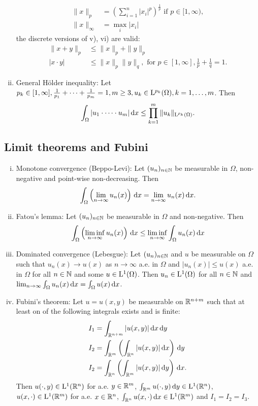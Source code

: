 \begin{enumerate}[i)]
    \begin{align*}
      \|x\|_p &= \left( \sum_{i = 1}^n |x_i|^p  \right)^{\frac{1}{p}} \text{ if } p \in [1,\infty), \\
        \|x\|_{\infty} &= \max_{i} |x_i|
    \end{align*}
    the discrete versions of v), vi) are valid:
    \begin{align*}
      \|x + y\|_p &\leq \|x\|_p + \|y\|_p \\
      |x \cdot y| &\leq \|x\|_p \|y\|_q, \text{ for } p \in [1, \infty], \frac{1}{p} + \frac{1}{q} =1.
    \end{align*}
  \item General Hölder inequality: Let $p_k \in [1,\infty], \frac{1}{p_1} + \cdots+ \frac{1}{p_m} = 1, m \geq 3, u_k \in \mathrm{L}^{p_k}(\Omega), k = 1,\dots,m$.
    Then
    $$
    \int_\Omega |u_1 \cdot \cdots \cdot u_m| \, {\operatorname{d}\!{x}} \leq \prod_{k = 1}^m \|u_k\|_{\mathrm{L}^{p_k}(\Omega)}.
    $$
\end{enumerate}

\subsection{Limit theorems and Fubini}

\begin{enumerate}[i)]
  \item Monotone convergence (Beppo-Levi): Let $(u_n)_{n \in \mathbb{N}}$ be measurable in $\Omega$, non-negative and point-wise non-decreasing. Then
    $$
    \int_\Omega \left( \lim_{n \to \infty} u_n(x) \right) \, {\operatorname{d}\!{x}} = \lim_{n \to \infty} u_n(x) \, {\operatorname{d}\!{x}}.
    $$
  \item Fatou's lemma: Let $(u_n)_{n \in \mathbb{N}}$ be measurable in $\Omega$ and non-negative. Then
    $$
    \int_\Omega \left( \liminf_{n \to \infty} u_n(x) \right) \, {\operatorname{d}\!{x}} 
    \leq \liminf_{n \to \infty} \int_\Omega u_n(x) \, {\operatorname{d}\!{x}}
    $$
  \item Dominated convergence (Lebesgue): Let $(u_n)_{n \in \mathbb{N}}$ and $u$ be measurable on $\Omega$ such that $u_n(x) \to u(x)$ as $n \to \infty$ a.e. in $\Omega$ and $|u_n(x)| \leq u(x)$ a.e. in $\Omega$ for all $n \in \mathbb{N}$ and some $u \in \mathrm{L}^1(\Omega)$.
    Then $u_n \in \mathrm{L}^1(\Omega)$ for all $n \in \mathbb{N}$ and $\lim_{n \to \infty} \int_\Omega u_n(x) \, {\operatorname{d}\!{x}} = \int_\Omega u(x) \, {\operatorname{d}\!{x}}$.
  \item Fubini's theorem: Let $u = u(x,y)$ be measurable on $\mathbb{R}^{n + m}$ such that at least on of the following integrals exists and is finite:
    \begin{align*}
      I_1 &= \int_{\mathbb{R}^{n + m}} |u(x,y)| \, {\operatorname{d}\!{x}} \, {\operatorname{d}\!{y}} \\
      I_2 &= \int_{\mathbb{R}^m} \left( \int_{\mathbb{R}^n} |u(x,y)| \, {\operatorname{d}\!{x}} \right) \, {\operatorname{d}\!{y}} \\
      I_2 &= \int_{\mathbb{R}^n} \left( \int_{\mathbb{R}^m} |u(x,y)| \, {\operatorname{d}\!{y}} \right) \, {\operatorname{d}\!{x}}.
    \end{align*}
    Then $u(\cdot,y) \in \mathrm{L}^1(\mathbb{R}^n)$ for a.e. $y \in \mathbb{R}^m$, $\int_{\mathbb{R}^m} u(\cdot,y) \, {\operatorname{d}\!{y}} \in \mathrm{L}^1(\mathbb{R}^n)$, $u(x,\cdot) \in \mathrm{L}^1(\mathbb{R}^m)$ for a.e. $x \in \mathbb{R}^n$, $\int_{\mathbb{R}^n} u(x, \cdot) \, {\operatorname{d}\!{x}} \in \mathrm{L}^1(\mathbb{R}^m)$ and $I_1 = I_2 = I_3$.
\end{enumerate}

